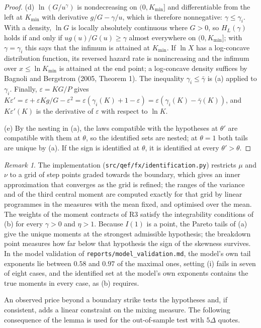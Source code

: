\documentclass[11pt]{article}
\theoremstyle{remark}
\newtheorem{remark}[proposition]{Remark}
\begin{document}
\begin{proof}
(d) $\ln(G/u^\gamma)$ is nondecreasing on $(0,K_{\min}]$ and differentiable from the left at $K_{\min}$ with derivative $g/G-\gamma/u$, which is therefore nonnegative: $\gamma\le\gamma_i$. With a density, $\ln G$ is locally absolutely continuous where $G>0$, so $H_L(\gamma)$ holds if and only if $ug(u)/G(u)\ge\gamma$ almost everywhere on $(0,K_{\min}]$; with $\gamma=\gamma_i$ this says that the infimum is attained at $K_{\min}$. If $\ln X$ has a log-concave distribution function, its reversed hazard rate is nonincreasing and the infimum over $x\le\ln K_{\min}$ is attained at the end point; a log-concave density suffices by Bagnoli and Bergstrom (2005, Theorem 1). The inequality $\gamma_i\le\bar\gamma$ is (a) applied to $\gamma_i$. Finally, $\varepsilon=KG/P$ gives $K\varepsilon'=\varepsilon+\varepsilon Kg/G-\varepsilon^2=\varepsilon(\gamma_i(K)+1-\varepsilon)=\varepsilon(\gamma_i(K)-\bar\gamma(K))$, and $K\varepsilon'(K)$ is the derivative of $\varepsilon$ with respect to $\ln K$.

(e) By the nesting in (a), the laws compatible with the hypotheses at $\theta'$ are compatible with them at $\theta$, so the identified sets are nested; at $\theta=1$ both tails are unique by (a). If the sign is identified at $\theta$, it is identified at every $\theta'>\theta$.
\end{proof}

\begin{remark}
The implementation (\texttt{src/qef/fx/identification.py}) restricts $\mu$ and $\nu$ to a grid of step points graded towards the boundary, which gives an inner approximation that converges as the grid is refined; the ranges of the variance and of the third central moment are computed exactly for that grid by linear programmes in the measures with the mean fixed, and optimised over the mean. The weights of the moment contracts of R3 satisfy the integrability conditions of (b) for every $\gamma>0$ and $\eta>1$. Because $I(1)$ is a point, the Pareto tails of (a) give the unique moments at the strongest admissible hypothesis; the breakdown point measures how far below that hypothesis the sign of the skewness survives. In the model validation of \texttt{reports/model\_validation.md}, the model's own tail exponents lie between $0.58$ and $0.97$ of the maximal ones, setting (i) fails in seven of eight cases, and the identified set at the model's own exponents contains the true moments in every case, as (b) requires.
\end{remark}

An observed price beyond a boundary strike tests the hypotheses and, if consistent, adds a linear constraint on the mixing measure. The following consequence of the lemma is used for the out-of-sample test with $5\Delta$ quotes.
\end{document}
